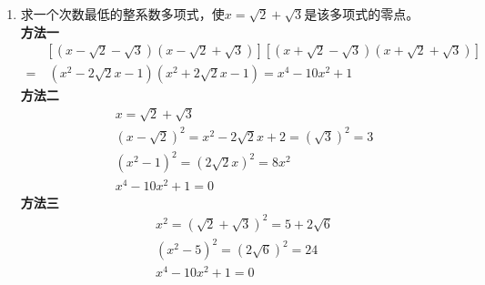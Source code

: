 \begin{enumerate}[label={【\textbf{例\thechapter.\arabic*}】},
 leftmargin=\inteval{\myenumleftmargin}pt,
 itemsep=\inteval{\myenumitempsep}pt,
 itemindent=\inteval{\myenumitemindent}pt]
\begin{align*}
    -(\sqrt{n}-\sqrt{n-1})^k\right] 
\end{align*}
所以，
{\small \begin{align*}
        &\ \sqrt{N(N-1)}\\
        =&\ \dfrac{1}{2}\left[(\sqrt{n}+\sqrt{n-1})^k
        +(\sqrt{n}-\sqrt{n-1})^k\right]\cdot
        \dfrac{1}{2}\left[(\sqrt{n}+\sqrt{n-1})^k
        -(\sqrt{n}-\sqrt{n-1})^k\right] \\
        =&\ \dfrac{1}{4}\left[(\sqrt{n}+\sqrt{n-1})^{2k}-
        (\sqrt{n}-\sqrt{n-1})^{2k}\right] \\  
        =&\ \dfrac{1}{2}\left[C_{2k}^1(\sqrt{n})(\sqrt{n-1})^{2k-1}
        +C_{2k}^3(\sqrt{n})^3(\sqrt{n-1})^{2k-3}+
        C_{2k}^5(\sqrt{n})^5(\sqrt{n-1})^{2k-5}+\cdots\right] \\
        =&\ \uwave{\dfrac{1}{2}\left[C_{2k}^1(\sqrt{n-1})^{2k-2}
            +C_{2k}^3(\sqrt{n})^2(\sqrt{n-1})^{2k-4}+
            C_{2k}^5(\sqrt{n})^4(\sqrt{n-1})^{2k-6}+\cdots\right]}
        \cdot\sqrt{n(n-1)}
\end{align*} }
根据\ref{偶数件物品选奇数件是偶数}，
$ C_{2k}^1,C_{2k}^3,C_{2k}^5,\cdots $都是偶数，且上式中括号内
$ \sqrt{n},\sqrt{n-1} $的指数都是偶数，所以，划波浪线的部分必定是整数，
$ \sqrt{N(N-1)n(n-1)} $也必然是整数，证毕。

\item 求一个次数最低的整系数多项式，使$ x=\sqrt{2}+\sqrt{3} $是该多项式的零点。\\
\textbf{方法一}\ 
\begin{align*}
    &\left[(x-\sqrt{2}-\sqrt{3})(x-\sqrt{2}+\sqrt{3})\right]
    \left[(x+\sqrt{2}-\sqrt{3})(x+\sqrt{2}+\sqrt{3})\right] \\
    =&\ (x^2-2\sqrt{2}x-1)(x^2+2\sqrt{2}x-1)=x^4 - 10x^2 + 1 
\end{align*}
\textbf{方法二}\ 
\begin{align}
    & x=\sqrt{2}+\sqrt{3} \nonumber \\
    & (x-\sqrt{2})^2=x^2-2\sqrt{2}x+2=(\sqrt{3})^2=3 \nonumber \\
    & (x^2-1)^2=(2\sqrt{2}x)^2=8x^2 \nonumber \\
    & x^4 - 10x^2 + 1= 0  \label{x4-10x2+1}
\end{align}
\textbf{方法三}\ 
\begin{align*}
    & x^2=(\sqrt{2}+\sqrt{3})^2=5+2\sqrt{6} \\
    & (x^2-5)^2=(2\sqrt{6})^2=24 \\
    & x^4 - 10x^2 + 1= 0
\end{align*}


\end{enumerate}
